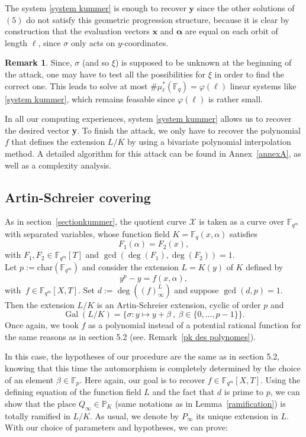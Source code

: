 \documentclass[10pt]{article}
\theoremstyle{definition}
\newtheorem{rq1}[thm]{Remark}
\theoremstyle{definition}
\theoremstyle{definition}
\newcommand{\PP}{\mathbb{P}}
\newcommand{\fqm}{\mathbb{F}_{q^m}}
\newcommand{\fq}{\mathbb{F}_q}
\newcommand{\X}{\mathcal{X}}
\newcommand{\Gal}{\operatorname{Gal}}
\begin{document}
The system \eqref{system kummer} is enough to recover $\mathbf{y}$ since the other solutions of $(5)$ do not satisfy this geometric progression structure, because it is clear by construction that the evaluation vectors $\mathbf{x}$ and $\boldsymbol{\alpha}$ are equal on each orbit of length $\ell$, since $\sigma$ only acts on $y$-coordinates.

\begin{rq1} Since, $\sigma$ (and so $\xi$) is supposed to be unknown at the beginning of the attack, one may have to test all the possibilities for $\xi$ in order to find the correct one. This leads to solve at most $\#\mu^*_{\ell}(\fq) = \varphi(\ell)$ linear systems like \eqref{system kummer}, which remains feasable since $\varphi(\ell)$ is rather small.
\end{rq1}

In all our computing experiences, system \eqref{system kummer} allows us to recover the desired vector \textbf{y}. To finish the attack, we only have to recover the polynomial $f$ that defines the extension $L/K$ by using a bivariate polynomial interpolation method. A detailed algorithm for this attack can be found in Annex~\ref{annexA}, as well as a complexity analysis.

\subsection{Artin-Schreier covering} \label{sectionas}

As in section~\ref{sectionkummer}, the quotient curve $\X$ is taken as a curve over $\fqm$ with separated variables, whose function field $K = \fq(x,\alpha)$ satisfies 
\[F_1(\alpha) = F_2(x),\] 
with $F_1,F_2 \in \fqm[T]$ and $\gcd(\deg(F_1),\deg(F_2))=1$. \\ 
Let $p:=\mathrm{char}(\fqm)$ and consider the extension $L=K(y)$ of $K$ defined by
\[y^p-y = f(x,\alpha),\]
with $\ f \in \fqm[X,T]$. Set $d:=\deg\left((f)^L_{\infty}\right)$ and suppose $\gcd(d,p)=1$. Then the extension $L/K$ is an Artin-Schreier extension, cyclic of order $p$ and 
\[\Gal(L/K) = \{ \sigma : y \mapsto y + \beta \ , \ \beta \in \{0,...,p-1\}\}.\]
Once again, we took $f$ as a polynomial instead of a potential rational function for the same reasons as in section 5.2 (see. Remark~\ref{pk des polynomes}).

In this case, the hypotheses of our procedure are the same as in section 5.2, knowing that this time the automorphism is completely determined by the choice of an element $\beta \in \mathbb{F}_p$. Here again, our goal is to recover $f \in \fqm[X,T]$. Using the defining equation of the function field $L$ and the fact that $d$ is prime to $p$, we can show that the place $Q_{\infty} \in \PP_K$ (same notations as in Lemma~\ref{ramification}) is totally ramified in $L/K$. As usual, we denote by $P_{\infty}$ its unique extension in $L$. With our choice of parameters and hypotheses, we can prove:
\end{document}
